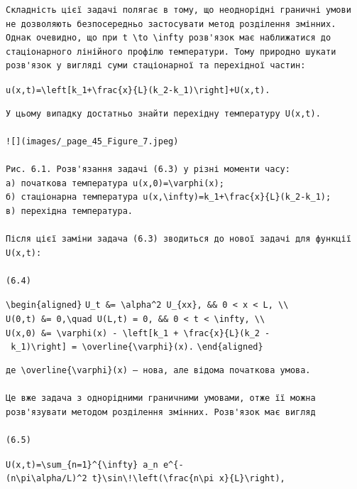 \documentclass[
  ukrainian,
]{article}
\begin{document}
\begin{verbatim}
Складність цієї задачі полягає в тому, що неоднорідні граничні умови не дозволяють безпосередньо застосувати метод розділення змінних. Однак очевидно, що при t \to \infty розв'язок має наближатися до стаціонарного лінійного профілю температури. Тому природно шукати розв'язок у вигляді суми стаціонарної та перехідної частин:
\end{verbatim}

\texttt{u(x,t)=\textbackslash{}left{[}k\_1+\textbackslash{}frac\{x\}\{L\}(k\_2-k\_1)\textbackslash{}right{]}+U(x,t).}

\begin{verbatim}
У цьому випадку достатньо знайти перехідну температуру U(x,t).

![](images/_page_45_Figure_7.jpeg)

Рис. 6.1. Розв'язання задачі (6.3) у різні моменти часу:
а) початкова температура u(x,0)=\varphi(x);
б) стаціонарна температура u(x,\infty)=k_1+\frac{x}{L}(k_2-k_1);
в) перехідна температура.

Після цієї заміни задача (6.3) зводиться до нової задачі для функції U(x,t):

(6.4)
\end{verbatim}

\texttt{\textbackslash{}begin\{aligned\}}
\texttt{U\_t\ \&=\ \textbackslash{}alpha\^{}2\ U\_\{xx\},\ \&\&\ 0\ \textless{}\ x\ \textless{}\ L,\ \textbackslash{}\textbackslash{}}
\texttt{U(0,t)\ \&=\ 0,\textbackslash{}quad\ U(L,t)\ =\ 0,\ \&\&\ 0\ \textless{}\ t\ \textless{}\ \textbackslash{}infty,\ \textbackslash{}\textbackslash{}}
\texttt{U(x,0)\ \&=\ \textbackslash{}varphi(x)\ -\ \textbackslash{}left{[}k\_1\ +\ \textbackslash{}frac\{x\}\{L\}(k\_2\ -\ k\_1)\textbackslash{}right{]}\ =\ \textbackslash{}overline\{\textbackslash{}varphi\}(x).}
\texttt{\textbackslash{}end\{aligned\}}

\begin{verbatim}
де \overline{\varphi}(x) — нова, але відома початкова умова.

Це вже задача з однорідними граничними умовами, отже її можна розв'язувати методом розділення змінних. Розв'язок має вигляд

(6.5)
\end{verbatim}

\texttt{U(x,t)=\textbackslash{}sum\_\{n=1\}\^{}\{\textbackslash{}infty\}\ a\_n\ e\^{}\{-(n\textbackslash{}pi\textbackslash{}alpha/L)\^{}2\ t\}\textbackslash{}sin\textbackslash{}!\textbackslash{}left(\textbackslash{}frac\{n\textbackslash{}pi\ x\}\{L\}\textbackslash{}right),}
\end{document}
